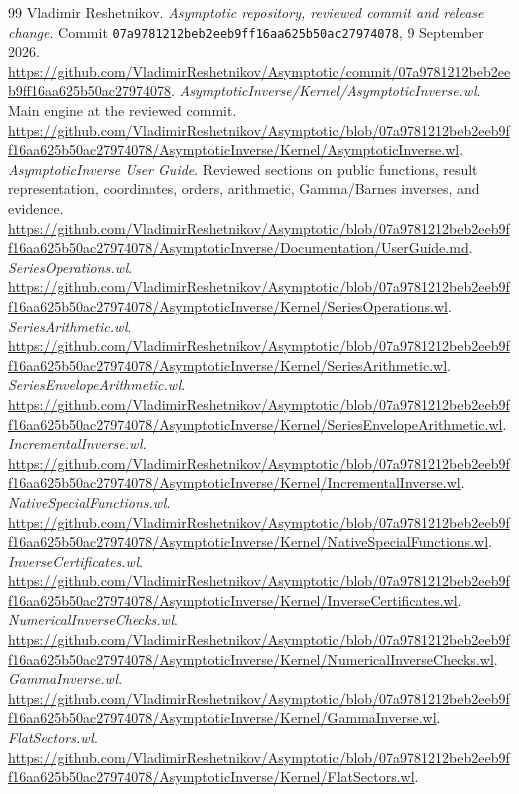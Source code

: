\documentclass[11pt,letterpaper]{article}
\newcommand{\commit}{\texttt{07a9781212beb2eeb9ff16aa625b50ac27974078}}
\begin{document}
\clearpage
\begin{thebibliography}{99}
\small
{} Vladimir Reshetnikov. \emph{Asymptotic repository, reviewed commit and release change}. Commit \commit, 9 September 2026. \url{https://github.com/VladimirReshetnikov/Asymptotic/commit/07a9781212beb2eeb9ff16aa625b50ac27974078}.
 \emph{AsymptoticInverse/Kernel/AsymptoticInverse.wl}. Main engine at the reviewed commit. \url{https://github.com/VladimirReshetnikov/Asymptotic/blob/07a9781212beb2eeb9ff16aa625b50ac27974078/AsymptoticInverse/Kernel/AsymptoticInverse.wl}.
 \emph{AsymptoticInverse User Guide}. Reviewed sections on public functions, result representation, coordinates, orders, arithmetic, Gamma/Barnes inverses, and evidence. \url{https://github.com/VladimirReshetnikov/Asymptotic/blob/07a9781212beb2eeb9ff16aa625b50ac27974078/AsymptoticInverse/Documentation/UserGuide.md}.
 \emph{SeriesOperations.wl}. \url{https://github.com/VladimirReshetnikov/Asymptotic/blob/07a9781212beb2eeb9ff16aa625b50ac27974078/AsymptoticInverse/Kernel/SeriesOperations.wl}.
 \emph{SeriesArithmetic.wl}. \url{https://github.com/VladimirReshetnikov/Asymptotic/blob/07a9781212beb2eeb9ff16aa625b50ac27974078/AsymptoticInverse/Kernel/SeriesArithmetic.wl}.
 \emph{SeriesEnvelopeArithmetic.wl}. \url{https://github.com/VladimirReshetnikov/Asymptotic/blob/07a9781212beb2eeb9ff16aa625b50ac27974078/AsymptoticInverse/Kernel/SeriesEnvelopeArithmetic.wl}.
 \emph{IncrementalInverse.wl}. \url{https://github.com/VladimirReshetnikov/Asymptotic/blob/07a9781212beb2eeb9ff16aa625b50ac27974078/AsymptoticInverse/Kernel/IncrementalInverse.wl}.
 \emph{NativeSpecialFunctions.wl}. \url{https://github.com/VladimirReshetnikov/Asymptotic/blob/07a9781212beb2eeb9ff16aa625b50ac27974078/AsymptoticInverse/Kernel/NativeSpecialFunctions.wl}.
 \emph{InverseCertificates.wl}. \url{https://github.com/VladimirReshetnikov/Asymptotic/blob/07a9781212beb2eeb9ff16aa625b50ac27974078/AsymptoticInverse/Kernel/InverseCertificates.wl}.
 \emph{NumericalInverseChecks.wl}. \url{https://github.com/VladimirReshetnikov/Asymptotic/blob/07a9781212beb2eeb9ff16aa625b50ac27974078/AsymptoticInverse/Kernel/NumericalInverseChecks.wl}.
 \emph{GammaInverse.wl}. \url{https://github.com/VladimirReshetnikov/Asymptotic/blob/07a9781212beb2eeb9ff16aa625b50ac27974078/AsymptoticInverse/Kernel/GammaInverse.wl}.
 \emph{FlatSectors.wl}. \url{https://github.com/VladimirReshetnikov/Asymptotic/blob/07a9781212beb2eeb9ff16aa625b50ac27974078/AsymptoticInverse/Kernel/FlatSectors.wl}.

\end{thebibliography}
\end{document}
